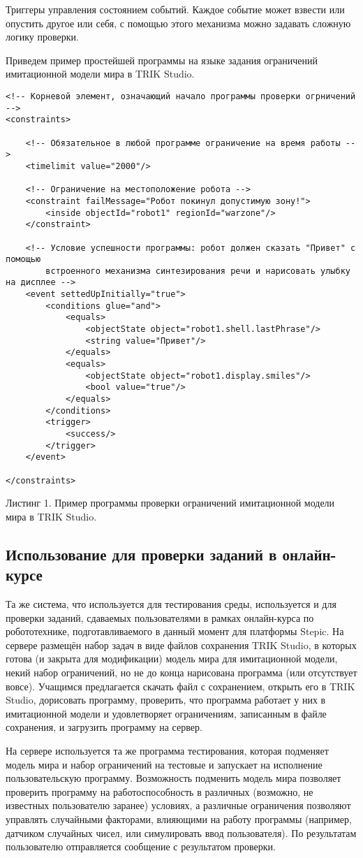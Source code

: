 ﻿\documentclass[conference]{IEEEtran}
\begin{document}
Триггеры управления состоянием событий. Каждое событие может взвести или опустить другое или себя, с помощью этого механизма можно задавать сложную логику проверки.

Приведем пример простейшей программы на языке задания ограничений имитационной модели мира в TRIK Studio.

\begin{verbatim}
<!-- Корневой элемент, означающий начало программы проверки огрничений -->
<constraints>

	<!-- Обязательное в любой программе ограничение на время работы -->
	<timelimit value="2000"/>
	
	<!-- Ограничение на местоположение робота -->
	<constraint failMessage="Робот покинул допустимую зону!">
		<inside objectId="robot1" regionId="warzone"/>
	</constraint>
	
	<!-- Условие успешности программы: робот должен сказать "Привет" с помощью
		встроенного механизма синтезирования речи и нарисовать улыбку на дисплее -->
	<event settedUpInitially="true">
		<conditions glue="and">
			<equals>
				<objectState object="robot1.shell.lastPhrase"/>
				<string value="Привет"/>
			</equals>
			<equals>
				<objectState object="robot1.display.smiles"/>
				<bool value="true"/>
			</equals>
		</conditions>
		<trigger>
			<success/>
		</trigger>
	</event>
	
</constraints>
\end{verbatim}
Листинг 1. Пример программы проверки ограничений имитационной модели мира в TRIK Studio.

\subsection{Использование для проверки заданий в онлайн-курсе}
Та же система, что используется для тестирования среды, используется и для проверки 
заданий, сдаваемых пользователями в рамках онлайн-курса по робототехнике, подготавливаемого 
в данный момент для платформы Stepic. На сервере размещён набор задач в виде файлов 
сохранения TRIK Studio, в которых готова (и закрыта для модификации) модель мира для 
имитационной модели, некий набор ограничений, но не до конца нарисована программа 
(или отсутствует вовсе). Учащимся предлагается скачать файл с сохранением, открыть 
его в TRIK Studio, дорисовать программу, проверить, что программа работает у них в 
имитационной модели и удовлетворяет ограничениям, записанным в файле сохранения, и 
загрузить программу на сервер.

На сервере используется та же программа тестирования, которая подменяет модель мира 
и набор ограничений на тестовые и запускает на исполнение пользовательскую программу. 
Возможность подменить модель мира позволяет проверить программу на работоспособность 
в различных (возможно, не известных пользователю заранее) условиях, а различные ограничения 
позволяют управлять случайными факторами, влияющими на работу программы (например, 
датчиком случайных чисел, или симулировать ввод пользователя). По результатам пользователю 
отправляется сообщение с результатом проверки.
\end{document}
